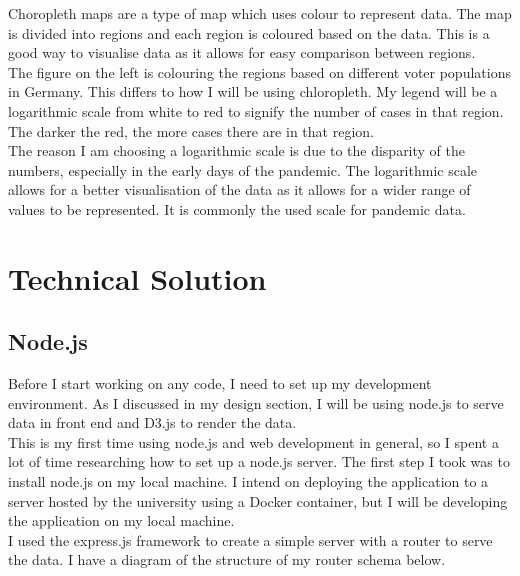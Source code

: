 \documentclass{report}
\begin{document}
Choropleth maps are a type of map which uses colour to represent data. The map is divided into regions and each region is coloured based on the data. This is a good way to visualise data as it allows for easy comparison between regions.\\

The figure on the left is colouring the regions based on different voter populations in Germany. This differs to how I will be using chloropleth. My legend will be a logarithmic scale from white to red to signify the number of cases in that region. The darker the red, the more cases there are in that region.\\

The reason I am choosing a logarithmic scale is due to the disparity of the numbers, especially in the early days of the pandemic. The logarithmic scale allows for a better visualisation of the data as it allows for a wider range of values to be represented. It is commonly the used scale for pandemic data.

\newpage
\chapter{Technical Solution}
\section{Node.js}
Before I start working on any code, I need to set up my development environment. As I discussed in my design section, I will be using node.js to serve data in front end and D3.js to render the data.\\

This is my first time using node.js and web development in general, so I spent a lot of time researching how to set up a node.js server. The first step I took was to install node.js on my local machine. I intend on deploying the application to a server hosted by the university using a Docker container, but I will be developing the application on my local machine.\\

I used the express.js framework to create a simple server with a router to serve the data. I have a diagram of the structure of my router schema below.
\end{document}
